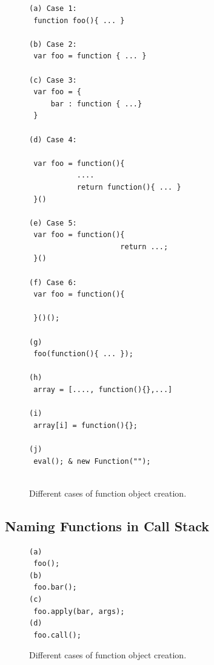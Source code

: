 \documentclass[conference]{IEEEtran}
\begin{document}


\begin{figure}[htp]
\begin{verbatim}
(a) Case 1:
 function foo(){ ... }

(b) Case 2:
 var foo = function { ... } 
 
(c) Case 3:
 var foo = {
     bar : function { ...}
 }

(d) Case 4:

 var foo = function(){
           ....
           return function(){ ... }
 }()
 
(e) Case 5:
 var foo = function(){ 
 					 return ...;
 }()					
 
(f) Case 6:
 var foo = function(){
 
 }()();
 
(g)
 foo(function(){ ... });
 
(h)
 array = [...., function(){},...]
 
(i)
 array[i] = function(){};   

(j)
 eval(); & new Function("");
 
\end{verbatim}
\caption{Different cases of function object creation.}
\label{fig:functionCreation}
\end{figure}

\subsection{Naming Functions in Call Stack}

\begin{figure}[htp]
\begin{verbatim}
(a)
 foo();
(b)
 foo.bar();
(c)
 foo.apply(bar, args);
(d)
 foo.call();
\end{verbatim}
\caption{Different cases of function object creation.}
\label{fig:functionCall}
\end{figure}
\end{document}
